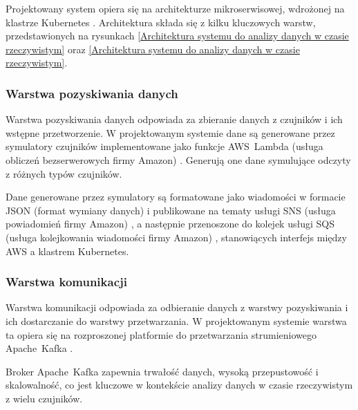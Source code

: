 Projektowany system opiera się na architekturze mikroserwisowej, wdrożonej na klastrze Kubernetes \cite{kubernetes_benefits}.
Architektura składa się z kilku kluczowych warstw, przedstawionych na rysunkach \ref{Architektura systemu do analizy danych w czasie rzeczywistym} oraz \ref{Architektura systemu do analizy danych w czasie rzeczywistym}.



\newpage

\subsubsection{Warstwa pozyskiwania danych}
\label{subsubsec:warstwa_pozyskiwania}

Warstwa pozyskiwania danych odpowiada za zbieranie danych z czujników i ich wstępne przetworzenie.
W projektowanym systemie dane są generowane przez symulatory czujników implementowane jako funkcje \mbox{AWS Lambda} (usługa obliczeń bezserwerowych firmy Amazon) \cite{aws_lambda_docs}.
Generują one dane symulujące odczyty z różnych typów czujników.

Dane generowane przez symulatory są formatowane jako wiadomości w formacie JSON (format wymiany danych) \cite{json_schema_org} i publikowane na tematy usługi SNS (usługa powiadomień firmy Amazon) \cite{sns_docs}, a następnie przenoszone do kolejek usługi SQS (usługa kolejkowania wiadomości firmy Amazon) \cite{sqs_docs}, stanowiących interfejs między AWS a klastrem Kubernetes.

\subsubsection{Warstwa komunikacji}
\label{subsubsec:warstwa_komunikacji}

Warstwa komunikacji odpowiada za odbieranie danych z warstwy pozyskiwania i ich dostarczanie do warstwy przetwarzania.
W projektowanym systemie warstwa ta opiera się na rozproszonej platformie do przetwarzania strumieniowego \mbox{Apache Kafka} \cite{kafka}.


Broker \mbox{Apache Kafka} zapewnia trwałość danych, wysoką przepustowość i skalowalność, co jest kluczowe w kontekście analizy danych w czasie rzeczywistym z wielu czujników.

